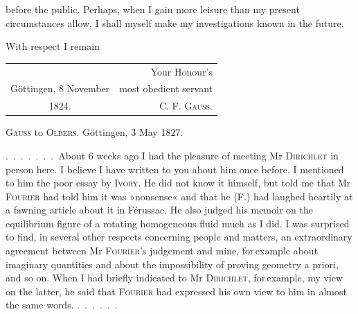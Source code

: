 before the public. Perhaps, when I gain
more leisure than my present circumstances allow, I shall myself
make my investigations known in the future.

With respect I remain
\begin{center}
\begin{tabular}{@{}l@{\qquad}r@{}}
 & Your Honour's\\
Göttingen, 8 November & most obedient servant\\
\multicolumn{1}{c}{1824.} & \textsc{C. F. Gauss.}
\end{tabular}
\end{center}
\medskip

\begin{center}
\textsc{Gauss} to \textsc{Olbers}. Göttingen, 3 May 1827.
\end{center}

.\ .\ .\ .\ .\ .\ .\ About 6 weeks ago I had the pleasure of meeting Mr \textsc{Dirichlet}
in person here. I believe I have written to you about him once before.
I mentioned to him the poor essay by
\textsc{Ivory}. He did not know it himself, but told me that Mr \textsc{Fourier}
had told him it was »nonsense« and that he (F.) had laughed heartily at a
fawning article about it in Férussac. He also judged his
memoir on the equilibrium figure of a rotating homogeneous
fluid much as I did. I was surprised to find, in
several other respects concerning people and matters, an extraordinary
agreement between Mr \textsc{Fourier}'s judgement and mine, for\,example
about imaginary quantities and about the impossibility of proving geometry a priori, and so
on. When I had briefly indicated to Mr \textsc{Dirichlet}, for\,example, my view on the latter,
he said that \textsc{Fourier} had expressed his own view to him in almost the
same words.
.\ .\ .\ .\ .\ .

